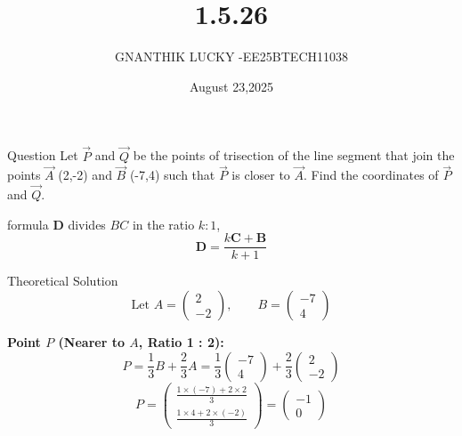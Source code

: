 \documentclass{beamer}
\begin{document}
\title 
{1.5.26}
\date{August 23,2025}


\author 
{GNANTHIK LUCKY -EE25BTECH11038}






\frame{\titlepage}
\begin{frame}{Question}
Let  $\vec{P}$ and $\vec{Q}$ be the points of trisection of the line segment that join the points  $\vec{A}$ (2,-2) and  $\vec{B}$ (-7,4) such that  $\vec{P}$ is closer to  $\vec{A}$. Find the coordinates of  $\vec{P}$ and  $\vec{Q}$.
\end{frame}

\begin{frame}{formula}
  \noindent
\textbf{D} divides $BC$ in the ratio $k : 1$, 
\[
    \mathbf{D} = \frac{k\mathbf{C} + \mathbf{B}}{k + 1}
\]
\end{frame}


\begin{frame}{Theoretical Solution}
\[
\text{Let } 
A = \begin{pmatrix} 2 \\ -2 \end{pmatrix}, \qquad
B = \begin{pmatrix} -7 \\ 4 \end{pmatrix}
\]

\textbf{Point \( P \) (Nearer to \( A \), Ratio 1 : 2):}
\[
P = \frac{1}{3} B + \frac{2}{3} A 
= \frac{1}{3} \begin{pmatrix} -7 \\ 4 \end{pmatrix} 
  + \frac{2}{3} \begin{pmatrix} 2 \\ -2 \end{pmatrix}
\]
\[
P = \begin{pmatrix}
\frac{1 \times (-7) + 2 \times 2}{3} \\
\frac{1 \times 4 + 2 \times (-2)}{3}
\end{pmatrix}
= \begin{pmatrix} -1 \\ 0 \end{pmatrix}
\]
\end{frame}
\end{document}
